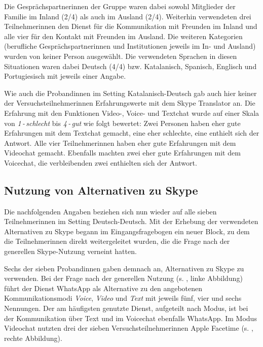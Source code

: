 Die Gesprächspartner{\textperiodcentered}innen der Gruppe waren dabei sowohl Mitglieder der Familie im Inland (2/4) als auch im Ausland (2/4). Weiterhin verwendeten drei Teilnehmer{\textperiodcentered}innen den Dienst für die Kommunikation mit Freunden im Inland und alle vier für den Kontakt mit Freunden im Ausland. Die weiteren Kategorien (berufliche Gesprächspartner{\textperiodcentered}innen und Institutionen jeweils im In- und Ausland) wurden von keiner Person ausgewählt. Die verwendeten Sprachen in diesen Situationen waren dabei Deutsch (4/4) bzw. Katalanisch, Spanisch, Englisch und Portugiesisch mit jeweils einer Angabe.

Wie auch die Proband{\textperiodcentered}innen im Setting Katalanisch-Deutsch gab auch hier keine{\textperiodcentered}r der Versuchsteilnehmer{\textperiodcentered}innen Erfahrungswerte mit dem Skype Translator an. Die Erfahrung mit den Funktionen Video-, Voice- und Textchat wurde auf einer Skala von \emph{1\,-\,schlecht} bis \emph{4\,-\,gut} wie folgt bewertet: Zwei Personen haben eher gute Erfahrungen mit dem Textchat gemacht, eine eher schlechte, eine enthielt sich der Antwort. Alle vier Teilnehmer{\textperiodcentered}innen haben eher gute Erfahrungen mit dem Videochat gemacht. Ebenfalls machten zwei eher gute Erfahrungen mit dem Voicechat, die verbleibenden zwei enthielten sich der Antwort.


\subsection{Nutzung von Alternativen zu Skype}\largerpage
\label{K6:subsubsec:Nutzung-Alternativen-DD}


Die nachfolgenden Angaben beziehen sich nun wieder auf alle sieben Teilnehmer{\textperiodcentered}innen im Setting Deutsch-Deutsch. Mit der Erhebung der verwendeten Alternativen zu Skype begann im Eingangsfragebogen ein neuer Block, zu dem die Teilnehmer{\textperiodcentered}innen direkt weitergeleitet wurden, die die Frage nach der generellen Skype-Nutzung verneint hatten.

Sechs der sieben Proband{\textperiodcentered}innen gaben demnach an, Alternativen zu Skype zu verwenden. Bei der Frage nach der generellen Nutzung (s. , linke Abbildung) führt der Dienst WhatsApp als Alternative zu den angebotenen Kommunikationsmodi \emph{Voice}, \emph{Video} und \emph{Text} mit jeweils fünf, vier und sechs Nennungen. Der am häufigsten genutzte Dienst, aufgeteilt nach Modus, ist bei der Kommunikation über Text und im Voicechat ebenfalls WhatsApp. Im Modus Videochat nutzten drei der sieben Versuchsteilnehmer{\textperiodcentered}innen Apple Facetime (s. , rechte Abbildung).

